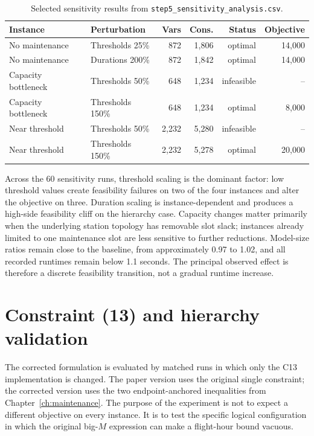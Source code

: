 \begin{table}[t]
\centering\small
\caption{Selected sensitivity results from \texttt{step5\_sensitivity\_analysis.csv}.}
\label{tab:sensitivity_anchor}
\begin{tabular}{llrrrr}
\toprule
Instance & Perturbation & Vars & Cons. & Status & Objective \\
\midrule
No maintenance & Thresholds 25\% & 872 & 1,806 & optimal & 14,000 \\
No maintenance & Durations 200\% & 872 & 1,842 & optimal & 14,000 \\
Capacity bottleneck & Thresholds 50\% & 648 & 1,234 & infeasible & -- \\
Capacity bottleneck & Thresholds 150\% & 648 & 1,234 & optimal & 8,000 \\
Near threshold & Thresholds 50\% & 2,232 & 5,280 & infeasible & -- \\
Near threshold & Thresholds 150\% & 2,232 & 5,278 & optimal & 20,000 \\
\bottomrule
\end{tabular}
\end{table}

Across the 60 sensitivity runs, threshold scaling is the dominant factor: low
threshold values create feasibility failures on two of the four instances and
alter the objective on three. Duration scaling is instance-dependent and
produces a high-side feasibility cliff on the hierarchy case. Capacity changes
matter primarily when the underlying station topology has removable slot
slack; instances already limited to one maintenance slot are less sensitive to
further reductions. Model-size ratios remain close to the baseline, from
approximately 0.97 to 1.02, and all recorded runtimes remain below 1.1 seconds.
The principal observed effect is therefore a discrete feasibility transition,
not a gradual runtime increase.

\section{Constraint (13) and hierarchy validation}
\label{sec:computational_c13}

The corrected formulation is evaluated by matched runs in which only the C13
implementation is changed. The paper version uses the original single
constraint; the corrected version uses the two endpoint-anchored inequalities
from Chapter~\ref{ch:maintenance}. The purpose of the experiment is not to
expect a different objective on every instance. It is to test the specific
logical configuration in which the original big-$M$ expression can make a
flight-hour bound vacuous.

